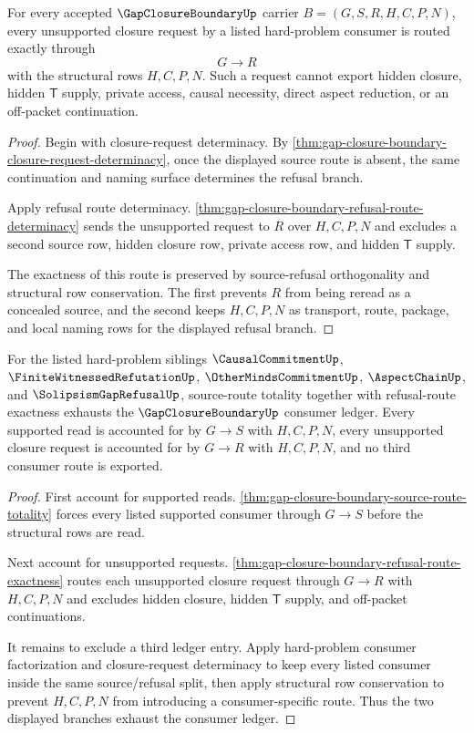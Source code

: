 \begin{theorem}
\label{thm:gap-closure-boundary-refusal-route-exactness}
For every accepted $\GapClosureBoundaryUp$ carrier $B=(G,S,R,H,C,P,N)$, every unsupported closure request by a listed hard-problem consumer is routed exactly through
$$
G \longrightarrow R
$$
with the structural rows $H,C,P,N$. Such a request cannot export hidden closure, hidden $\mathsf{T}$ supply, private access, causal necessity, direct aspect reduction, or an off-packet continuation.
\end{theorem}
\begin{proof}
Begin with closure-request determinacy. By \autoref{thm:gap-closure-boundary-closure-request-determinacy}, once the displayed source route is absent, the same continuation and naming surface determines the refusal branch.

Apply refusal route determinacy. \autoref{thm:gap-closure-boundary-refusal-route-determinacy} sends the unsupported request to $R$ over $H,C,P,N$ and excludes a second source row, hidden closure row, private access row, and hidden $\mathsf{T}$ supply.

The exactness of this route is preserved by source-refusal orthogonality and structural row conservation. The first prevents $R$ from being reread as a concealed source, and the second keeps $H,C,P,N$ as transport, route, package, and local naming rows for the displayed refusal branch.
\end{proof}

\begin{theorem}
\label{thm:gap-closure-boundary-consumer-ledger-exhaustion}
For the listed hard-problem siblings $\CausalCommitmentUp$, $\FiniteWitnessedRefutationUp$, $\OtherMindsCommitmentUp$, $\AspectChainUp$, and $\SolipsismGapRefusalUp$, source-route totality together with refusal-route exactness exhausts the $\GapClosureBoundaryUp$ consumer ledger. Every supported read is accounted for by $G \longrightarrow S$ with $H,C,P,N$, every unsupported closure request is accounted for by $G \longrightarrow R$ with $H,C,P,N$, and no third consumer route is exported.
\end{theorem}
\begin{proof}
First account for supported reads. \autoref{thm:gap-closure-boundary-source-route-totality} forces every listed supported consumer through $G \longrightarrow S$ before the structural rows are read.

Next account for unsupported requests. \autoref{thm:gap-closure-boundary-refusal-route-exactness} routes each unsupported closure request through $G \longrightarrow R$ with $H,C,P,N$ and excludes hidden closure, hidden $\mathsf{T}$ supply, and off-packet continuations.

It remains to exclude a third ledger entry. Apply hard-problem consumer factorization and closure-request determinacy to keep every listed consumer inside the same source/refusal split, then apply structural row conservation to prevent $H,C,P,N$ from introducing a consumer-specific route. Thus the two displayed branches exhaust the consumer ledger.
\end{proof}

